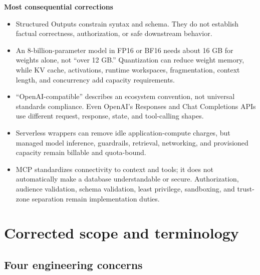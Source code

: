 \documentclass[10pt]{article}
\begin{document}
\begin{keybox}
\textbf{Most consequential corrections}
\begin{itemize}
  \item Structured Outputs constrain syntax and schema. They do not establish factual correctness, authorization, or safe downstream behavior.\cite{openai-structured,nist-genai,owasp-top10}
  \item An 8-billion-parameter model in FP16 or BF16 needs about 16 GB for weights alone, not ``over 12 GB.'' Quantization can reduce weight memory, while KV cache, activations, runtime workspaces, fragmentation, context length, and concurrency add capacity requirements.\cite{hf-memory,vllm-opt,vllm-kv}
  \item ``OpenAI-compatible'' describes an ecosystem convention, not universal standards compliance. Even OpenAI's Responses and Chat Completions APIs use different request, response, state, and tool-calling shapes.\cite{openai-migrate}
  \item Serverless wrappers can remove idle application-compute charges, but managed model inference, guardrails, retrieval, networking, and provisioned capacity remain billable and quota-bound.\cite{bedrock-pricing,bedrock-quotas,api-gateway-quotas}
  \item MCP standardizes connectivity to context and tools; it does not automatically make a database understandable or secure. Authorization, audience validation, schema validation, least privilege, sandboxing, and trust-zone separation remain implementation duties.\cite{mcp-spec,mcp-security,nsa-mcp}
\end{itemize}
\end{keybox}

\tableofcontents
\newpage

\section{Corrected scope and terminology}

\subsection{Four engineering concerns}
\end{document}
